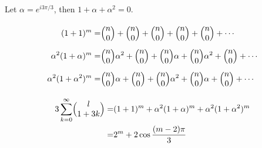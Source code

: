 \begin{solution}
Let $\alpha = e^{i 3\pi /3}$, then $1 + \alpha + \alpha^2 =0$.

\begin{align*}
    (1 + 1)^m = & \mybinom{n}{0} + \mybinom{n}{0} + \mybinom{n}{0} + \mybinom{n}{0} + \mybinom{n}{0} + \cdots \\
    \alpha ^2 (1+\alpha)^m = &  \mybinom{n}{0} \alpha^2 + \mybinom{n}{0} + \mybinom{n}{0} \alpha + \mybinom{n}{0}\alpha^2 + \mybinom{n}{0}  + \cdots \\
    \alpha ^2 (1+\alpha^2)^m = &  \mybinom{n}{0} \alpha + \mybinom{n}{0} + \mybinom{n}{0} \alpha^2 + \mybinom{n}{0}\alpha + \mybinom{n}{0}  + \cdots \\
\end{align*}

\begin{align*}
    3 \sum_{k=0}^{\infty} \mybinom{l}{1+3k} = & (1 + 1)^m + \alpha ^2 (1+\alpha)^m +\alpha ^2 (1+\alpha^2)^m  \\
    = &2^m + 2\cos \frac{(m-2)\pi}{3}
\end{align*}
\end{solution}


